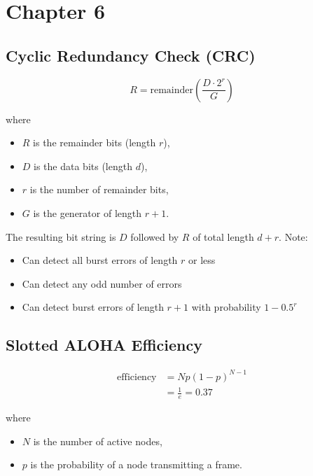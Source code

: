 \section{Chapter 6}

\subsection{Cyclic Redundancy Check (CRC)}

\begin{equation*}
    R = \text{remainder}\left(\frac{D \cdot 2^r}{G}\right)
\end{equation*}

where
\begin{itemize}
    \item $R$ is the remainder bits (length $r$),
    \item $D$ is the data bits (length $d$),
    \item $r$ is the number of remainder bits,
    \item $G$ is the generator of length $r+1$.
\end{itemize}

The resulting bit string is $D$ followed by $R$ of total length $d+r$. Note:
\begin{itemize}
    \item Can detect all burst errors of length $r$ or less
    \item Can detect any odd number of errors
    \item Can detect burst errors of length $r+1$ with probability $1 - 0.5^r$
\end{itemize}

\subsection{Slotted ALOHA Efficiency}

\begin{align*}
    \text{efficiency} & = Np(1-p)^{N-1}                               \\
                      & = \frac{1}{e} = 0.37 \tag{maximum efficiency}
\end{align*}

where
\begin{itemize}
    \item $N$ is the number of active nodes,
    \item $p$ is the probability of a node transmitting a frame.
\end{itemize}

